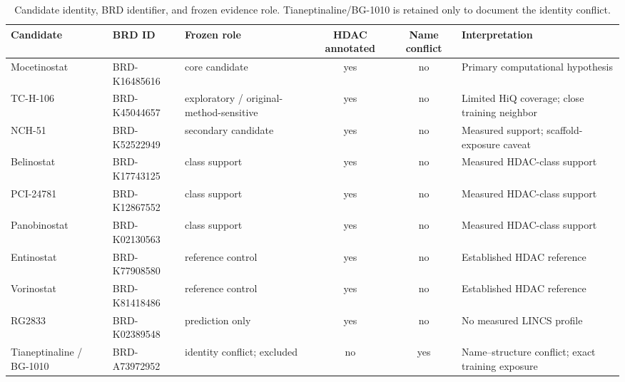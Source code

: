 \begingroup
\scriptsize
\begin{table}[H]
\centering
\caption{Candidate identity, BRD identifier, and frozen evidence role. Tianeptinaline/BG-1010 is retained only to document the identity conflict.}
\label{tab:s_identity}
\begin{tabular}{@{}p{2.8cm}p{2.8cm}p{4.2cm}ccp{7.5cm}@{}}
\toprule
Candidate & BRD ID & Frozen role & HDAC annotated & Name conflict & Interpretation \\
\midrule
Mocetinostat & BRD-K16485616 & core candidate & yes & no & Primary computational hypothesis \\
TC-H-106 & BRD-K45044657 & exploratory / original-method-sensitive & yes & no & Limited HiQ coverage; close training neighbor \\
NCH-51 & BRD-K52522949 & secondary candidate & yes & no & Measured support; scaffold-exposure caveat \\
Belinostat & BRD-K17743125 & class support & yes & no & Measured HDAC-class support \\
PCI-24781 & BRD-K12867552 & class support & yes & no & Measured HDAC-class support \\
Panobinostat & BRD-K02130563 & class support & yes & no & Measured HDAC-class support \\
Entinostat & BRD-K77908580 & reference control & yes & no & Established HDAC reference \\
Vorinostat & BRD-K81418486 & reference control & yes & no & Established HDAC reference \\
RG2833 & BRD-K02389548 & prediction only & yes & no & No measured LINCS profile \\
Tianeptinaline / BG-1010 & BRD-A73972952 & identity conflict; excluded & no & yes & Name--structure conflict; exact training exposure \\
\bottomrule
\end{tabular}
\end{table}
\endgroup
